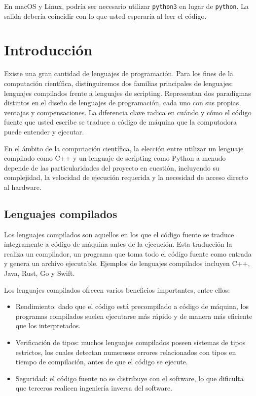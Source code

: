 En macOS y Linux, podría ser necesario utilizar \texttt{python3} en
lugar de \texttt{python}. La salida debería coincidir con lo que
usted esperaría al leer el código.

\section{Introducción}

Existe una gran cantidad de lenguajes de programación. Para los fines de la computación científica, distinguiremos dos familias principales de lenguajes: lenguajes compilados frente a lenguajes de scripting. Representan dos paradigmas distintos en el diseño de lenguajes de programación, cada uno con sus propias ventajas y compensaciones. La diferencia clave radica en cuándo y cómo el código fuente que usted escribe se traduce a código de máquina que la computadora puede entender y ejecutar.

En el ámbito de la computación científica, la elección entre utilizar un lenguaje compilado como C++ y un lenguaje de scripting como Python a menudo depende de las particularidades del proyecto en cuestión, incluyendo su complejidad, la velocidad de ejecución requerida y la necesidad de acceso directo al hardware.

\subsection{Lenguajes compilados}

Los lenguajes compilados son aquellos en los que el código fuente se traduce íntegramente a código de máquina antes de la ejecución. Esta traducción la realiza un compilador, un programa que toma todo el código fuente como entrada y genera un archivo ejecutable. Ejemplos de lenguajes compilados incluyen C++, Java, Rust, Go y Swift.

Los lenguajes compilados ofrecen varios beneficios importantes, entre ellos:

\begin{itemize}
	\item Rendimiento: dado que el código está precompilado a código de máquina, los programas compilados suelen ejecutarse más rápido y de manera más eficiente que los interpretados.
	\item Verificación de tipos: muchos lenguajes compilados poseen sistemas de tipos estrictos, los cuales detectan numerosos errores relacionados con tipos en tiempo de compilación, antes de que el código se ejecute.
	\item Seguridad: el código fuente no se distribuye con el software, lo que dificulta que terceros realicen ingeniería inversa del software.
\end{itemize}

